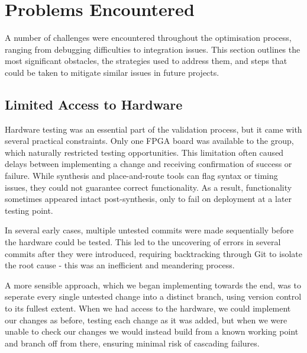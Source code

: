 \documentclass[a4paper,10pt]{article}
\begin{document}
\section{Problems Encountered}
\label{sec:Problems_Encountered}

A number of challenges were encountered throughout the optimisation process, 
ranging from debugging difficulties to integration issues. 
This section outlines the most significant obstacles, 
the strategies used to address them, 
and steps that could be taken to mitigate similar issues in future projects.

\subsection*{Limited Access to Hardware}

Hardware testing was an essential part of the validation process, 
but it came with several practical constraints. 
Only one FPGA board was available to the group, 
which naturally restricted testing opportunities. 
This limitation often caused delays between 
implementing a change and receiving confirmation of success or failure. 
While synthesis and place-and-route tools can flag syntax or timing issues, 
they could not guarantee correct functionality. 
As a result, functionality sometimes appeared intact post-synthesis, 
only to fail on deployment at a later testing point. 

In several early cases, multiple untested commits were made sequentially 
before the hardware could be tested. 
This led to the uncovering of errors in several commits 
after they were introduced, requiring backtracking through Git 
to isolate the root cause - 
this was an inefficient and meandering process.

A more sensible approach, which we began implementing towards the end,
was to seperate every single untested change into a distinct branch,
using version control to its fullest extent.
When we had access to the hardware, we could implement our changes as before,
testing each change as it was added,
but when we were unable to check our changes 
we would instead build from a known working point and branch off from there, 
ensuring minimal risk of cascading failures.
\end{document}
